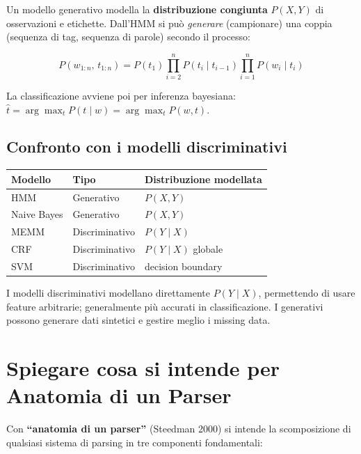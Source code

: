 \documentclass[12pt,a4paper]{article}
\begin{document}
Un modello generativo modella la \textbf{distribuzione congiunta} $P(X, Y)$ di osservazioni e etichette. Dall'HMM si può \emph{generare} (campionare) una coppia (sequenza di tag, sequenza di parole) secondo il processo:

\[
P(w_{1:n},\, t_{1:n}) = P(t_1)\prod_{i=2}^n P(t_i \mid t_{i-1})\prod_{i=1}^n P(w_i \mid t_i)
\]

La classificazione avviene poi per inferenza bayesiana: $\hat{t} = \arg\max_t P(t \mid w) = \arg\max_t P(w, t)$.

\subsection{Confronto con i modelli discriminativi}

\begin{center}
\begin{tabular}{lll}
\toprule
\textbf{Modello} & \textbf{Tipo} & \textbf{Distribuzione modellata} \\
\midrule
HMM & Generativo & $P(X, Y)$ \\
Naive Bayes & Generativo & $P(X, Y)$ \\
MEMM & Discriminativo & $P(Y \mid X)$ \\
CRF & Discriminativo & $P(Y \mid X)$ globale \\
SVM & Discriminativo & decision boundary \\
\bottomrule
\end{tabular}
\end{center}

I modelli discriminativi modellano direttamente $P(Y \mid X)$, permettendo di usare feature arbitrarie; generalmente più accurati in classificazione. I generativi possono generare dati sintetici e gestire meglio i missing data.

\section{Spiegare cosa si intende per Anatomia di un Parser}
\label{sec:anatomy}

Con \textbf{``anatomia di un parser''} (Steedman 2000) si intende la scomposizione di qualsiasi sistema di parsing in tre componenti fondamentali:
\end{document}
